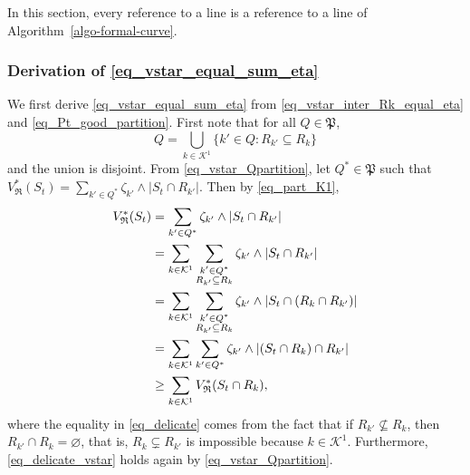 \documentclass[
  11pt,
  a4paper,
]{article}
\theoremstyle{plain}
\theoremstyle{definition}
\theoremstyle{plain}
\theoremstyle{definition}
\theoremstyle{plain}
\theoremstyle{remark}
\begin{document}
In this section, every reference to a line is a reference to a line of
Algorithm~\ref{algo-formal-curve}.

\subsubsection{\texorpdfstring{Derivation of
\eqref{eq_vstar_equal_sum_eta}}{Derivation of }}\label{derivation-of}

We first derive \eqref{eq_vstar_equal_sum_eta} from
\eqref{eq_vstar_inter_Rk_equal_eta} and \eqref{eq_Pt_good_partition}.
First note that for all \(Q\in\mathfrak P\), \begin{equation}
Q=\bigcup_{k\in\mathcal{K}^1}\{ k' \in Q : R_{k'}\subseteq R_k\}
\label{eq_part_K1}
\end{equation} and the union is disjoint. From
\eqref{eq_vstar_Qpartition}, let \(Q^*\in\mathfrak P\) such that
\(V^*_{\mathfrak{R}}(S_t) = \sum_{k'\in Q^*} \zeta_{k'}\wedge |S_t\cap R_{k'}|\).
Then by \eqref{eq_part_K1}, \begin{align}
V^*_{\mathfrak{R}}(S_t) &= \sum_{k'\in Q^*} \zeta_{k'}\wedge |S_t\cap R_{k'}|\notag\\
&=\sum_{k\in\mathcal{K}^1}  \sum_{\substack{k'\in Q^*\\ R_{k'}\subseteq R_k}} \zeta_{k'}\wedge |S_t\cap R_{k'}|\notag \\
&=\sum_{k\in\mathcal{K}^1}  \sum_{\substack{k'\in Q^*\\ R_{k'}\subseteq R_k}} \zeta_{k'}\wedge |S_t\cap (R_{k}\cap R_{k'})| \notag\\
&=\sum_{k\in\mathcal{K}^1}  \sum_{k'\in Q^*} \zeta_{k'}\wedge |(S_t\cap R_{k})\cap R_{k'}| \label{eq_delicate} \\
&\geq \sum_{k\in\mathcal{K}^1} V^*_{\mathfrak{R}}(S_t\cap R_k),\label{eq_delicate_vstar}
\end{align} where the equality in \eqref{eq_delicate} comes from the
fact that if \(R_{k'}\not\subseteq R_k\), then
\(R_{k'}\cap R_k=\varnothing\), that is, \(R_{k}\subsetneq R_{k'}\) is
impossible because \(k\in\mathcal K^1\). Furthermore,
\eqref{eq_delicate_vstar} holds again by \eqref{eq_vstar_Qpartition}.
\end{document}
